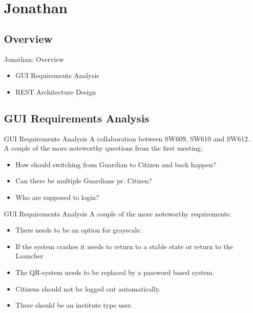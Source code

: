 \section{Jonathan}
\subsection{Overview}
\begin{frame}{Jonathan: Overview}
\begin{itemize}
\item GUI Requirements Analysis
\item REST Architecture Design
\end{itemize}
\end{frame}

\subsection{GUI Requirements Analysis}
\begin{frame}{GUI Requirements Analysis}
A collaboration between SW609, SW610 and SW612.\\

A couple of the more noteworthy questions from the first meeting:
\begin{itemize}
\item How should switching from Guardian to Citizen and back happen?
\item Can there be multiple Guardians pr. Citizen?
\item Who are supposed to login?
\end{itemize}

\end{frame}

\begin{frame}[fragile]{GUI Requirements Analysis}
A couple of the more noteworthy requirements:

\begin{itemize}
\item There needs to be an option for grayscale.
\item If the system crashes it needs to return to a stable state or return to the Launcher
\item The QR-system needs to be replaced by a password based system.
\item Citizens should not be logged out automatically.
\item There should be an institute type user.
\end{itemize}
\end{frame}

